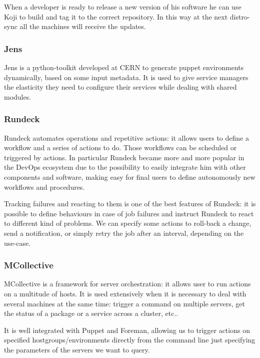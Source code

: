 When a developer is ready to release a new version of his software he can
use Koji to build and tag it to the correct repository. In this way at the
next distro-sync all the machines will receive the updates.

\subsubsection{Jens}

Jens is a python-toolkit developed at CERN to generate puppet environments
dynamically, based on some input metadata. It is used to give service
managers the elasticity they need to configure their services while
dealing with shared modules.


\subsubsection{Rundeck}

Rundeck automates operations and repetitive actions: it allows users to
define a workflow and a series of actions to do. Those workflows can be
scheduled or triggered by actions. In particular Rundeck became more and
more popular in the DevOps ecosystem due to the possibility to easily
integrate him with other components and software, making easy for final
users to define autonomously new workflows and procedures.

Tracking failures and reacting to them is one of the best features of
Rundeck: it is possible to define behaviours in case of job failures and
instruct Rundeck to react to different kind of problems. We can specify
some actions to roll-back a change, send a notification, or simply retry
the job after an interval, depending on the use-case. 

\subsubsection{MCollective}

MCollective is a framework for server orchestration: it allows user to run
actions on a multitude of hosts. It is used extensively when it is
necessary to deal with several machines at the same time: trigger
a command on multiple servers, get the status of a package or a service
across a cluster, etc..

It is well integrated with Puppet and Foreman, allowing us to trigger
actions on specified hostgroups/environments directly from the command
line just specifying the parameters of the servers we want to query.

